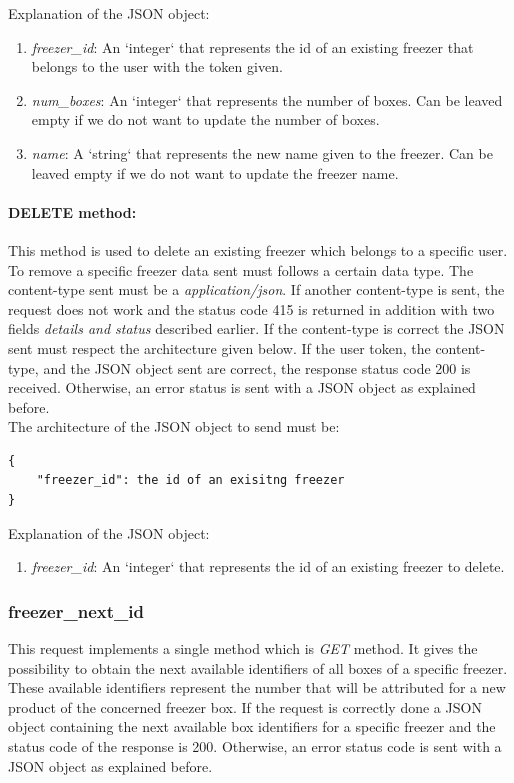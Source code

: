 Explanation of the  JSON object:
\begin{enumerate}
\item \textit{freezer\_id}: An `integer` that represents the id of an existing freezer that belongs to the user with the token given.
\item \textit{num\_boxes}: An `integer` that represents the number of boxes. Can be leaved empty if we do not want to update the number of boxes.
\item \textit{name}: A `string` that represents the new name given to the freezer. Can be leaved empty if we do not want to update the freezer name.
\end{enumerate}

\paragraph{DELETE method:} This method is used to delete an existing freezer which belongs to a specific user. To remove a specific freezer data sent must follows a certain data type.  The content-type sent must be a \textit{application/json}. If another content-type is sent, the request does not work and the status code 415 is returned in addition with two fields \textit{details and status} described earlier. If the content-type is correct the JSON sent must respect the architecture given below. If the user token, the content-type, and the JSON object sent are correct, the response status code 200 is received. Otherwise, an error status is sent with a JSON object as explained before.\\

The architecture of the JSON object to send must be:
\begin{lstlisting}
{
    "freezer_id": the id of an exisitng freezer
}
\end{lstlisting}

Explanation of the  JSON object:
\begin{enumerate}
\item \textit{freezer\_id}: An `integer` that represents the id of an existing freezer to delete.
\end{enumerate}

\subsubsection{freezer\_next\_id}
This request implements a single method which is \textit{GET} method. It gives the possibility to obtain the next available identifiers of all boxes of a specific freezer. These available identifiers represent the number that will be attributed for a new product of the concerned freezer box. If the request is correctly done a JSON object containing the next available box identifiers for a specific freezer and the status code of the response is 200. Otherwise, an error status code is sent with a JSON object as explained before.\\

